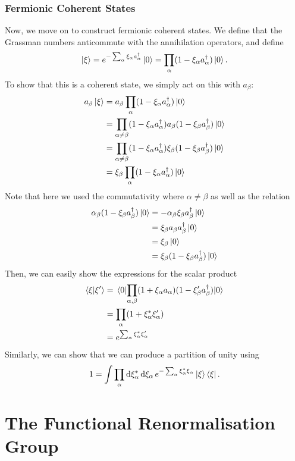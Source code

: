 \documentclass[twoside,symmetric, openany, 12pt]{./tuftebook}
\theoremstyle{definition}
\theoremstyle{definition}
\theoremstyle{definition}
\begin{document}
	\subsection{Fermionic Coherent States}
	Now, we move on to construct fermionic coherent states. We define that the Grassman numbers anticommute with the annihilation operators, and define
	\[
		\ket{\xi} = e^{-\sum_\alpha \xi_\alpha a_\alpha^\dagger} \ket{0} = \prod_\alpha (1-\xi_\alpha a_\alpha^\dagger)\ket{0}
	.\]
	To show that this is a coherent state, we simply act on this with $a_\beta$:
	\begin{align*}
		a_\beta\ket{\xi} &= a_\beta \prod_\alpha (1-\xi_\alpha a_\alpha^\dagger)\ket{0}\\
				 &= \prod_{\alpha \neq \beta} (1-\xi_\alpha a_\alpha^\dagger)a_\beta (1-\xi_\beta a_\beta^\dagger) \ket{0} \\
				 &= \prod_{\alpha \neq \beta} (1-\xi_\alpha a_\alpha^\dagger)\xi_\beta (1-\xi_\beta a_\beta^\dagger) \ket{0} \\
				 &=\xi_\beta \prod_\alpha (1-\xi_\alpha a_\alpha^\dagger)\ket{0}  \\
	\end{align*}
	Note that here we used the commutativity where $\alpha\neq \beta$ as well as the relation
	\begin{align*}
		\alpha_\beta (1-\xi_\beta a_\beta^\dagger)\ket{0} &= -\alpha_\beta \xi_\beta a_\beta^\dagger\ket{0} \\
								  &= \xi_\beta a_\beta a_\beta^\dagger\ket{0} \\
								  &= \xi_\beta\ket{0} \\
								  &= \xi_\beta(1 - \xi_\beta a_\beta^\dagger)\ket{0}
	\end{align*}
	Then, we can easily show the expressions for the scalar product
	\begin{align*}
		\braket{\xi}{\xi'} &= \mel{0}{\prod_{\alpha,\beta} (1+\xi_\alpha a_\alpha)(1-\xi'_\beta a^\dagger_\beta)}{0}\\
			&= \prod_\alpha ( 1+\xi_\alpha^* \xi'_\alpha ) \\
			&= e^{\sum_\alpha \xi^*_\alpha \xi_\alpha'}
	\end{align*}
	Similarly, we can show that we can produce a partition of unity using
	\[
		1 = \int \prod_\alpha \dd{\xi_\alpha^*}\dd{\xi_\alpha} e^{-\sum_\alpha \xi_\alpha^* \xi_\alpha} \ket{\xi}\bra{\xi}
	.\] 
	\chapter{The Functional Renormalisation Group}
\end{document}
